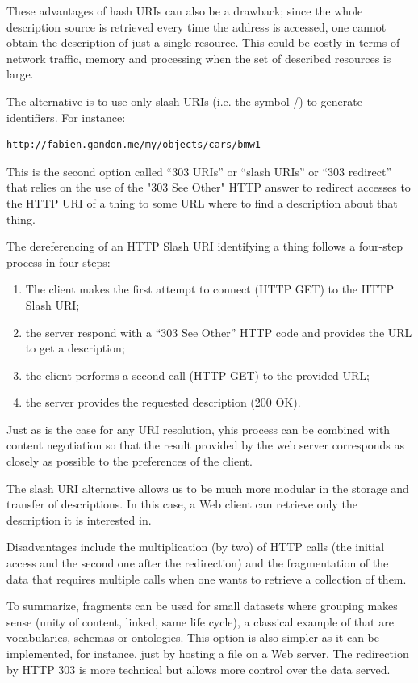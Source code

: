 These advantages of hash URIs can also be a drawback; since the whole
description source is retrieved every time the address is accessed, one
cannot obtain the description of just a  single resource.  This could 
be costly in terms of network traffic, memory and processing
when the set of described resources is large.

The alternative is to use only slash URIs (i.e. the symbol /) 
to generate identifiers. For instance:

\begin{lstlisting}
http://fabien.gandon.me/my/objects/cars/bmw1
\end{lstlisting}


This is the second option called ``303 URIs'' or ``slash URIs'' or ``303
redirect'' that relies on the use of the "303 See Other" HTTP answer to
redirect accesses to the HTTP URI of a thing to some URL where to find a
description about that thing.

The dereferencing of an HTTP Slash URI identifying a thing follows  a four-step 
process in four steps: 
\begin{enumerate}
    \item The client makes the first
attempt to connect (HTTP GET) to the HTTP Slash URI; 
    \item the server
respond with a ``303 See Other'' HTTP code and provides the URL to get a
description;
    \item the client performs a second call (HTTP GET) to the
provided URL;
    \item the server provides the requested description (200
OK).
\end{enumerate}

Just as is the case for any URI resolution, yhis process can be combined with 
content negotiation so that
the result provided by the web server corresponds as closely as possible to the preferences
of the client.

The slash URI alternative allows us to be much more modular in
the storage and transfer of descriptions. In this case, a Web client can
retrieve only the description it is interested in.

Disadvantages include the multiplication (by two) of HTTP calls (the
initial access and the second one after the redirection) and the
fragmentation of the data that requires multiple calls when one wants to
retrieve a collection of them.

To summarize, fragments can be used for small datasets where grouping
makes sense (unity of content, linked, same life cycle), a classical
example of that are vocabularies, schemas or ontologies. This option is
also simpler as it can be implemented, for instance, just by
hosting a file on a Web server. The redirection by HTTP 303 is more
technical but allows more control over the data served.


